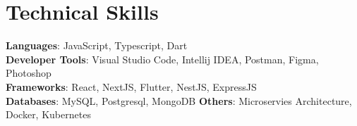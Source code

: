 \documentclass[a4paper,11pt]{article}
\begin{document}
\section{\textbf{Technical Skills}}
 \begin{itemize}[leftmargin=0.1in, label={}]
    \small{\item{
     \textbf{Languages}{: JavaScript, Typescript, Dart} \\
     \textbf{Developer Tools}{: Visual Studio Code, Intellij IDEA, Postman, Figma, Photoshop} \\
     \textbf{Frameworks}{: React, NextJS, Flutter, NestJS, ExpressJS} \\
     \textbf{Databases}{: MySQL, Postgresql, MongoDB}
     \textbf{Others}{: Microservies Architecture, Docker, Kubernetes}
     }}
 \end{itemize}
 \vspace{-16pt}




\end{document}
